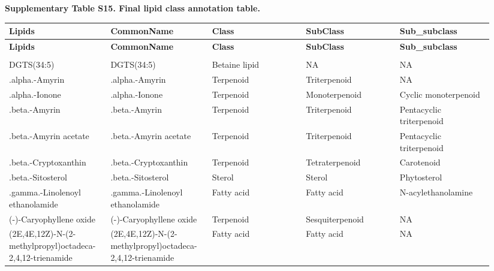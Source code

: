 \clearpage
\begin{landscape}
\begingroup
\scriptsize
\setlength{\LTleft}{0pt}
\setlength{\LTright}{0pt}
\setlength{\tabcolsep}{3pt}
\renewcommand{\arraystretch}{1.08}
\noindent\textbf{Supplementary Table S15. Final lipid class annotation table.}
\par\medskip
\begin{longtable}{>{\raggedright\arraybackslash}p{0.188\linewidth}>{\raggedright\arraybackslash}p{0.188\linewidth}>{\raggedright\arraybackslash}p{0.188\linewidth}>{\raggedright\arraybackslash}p{0.188\linewidth}>{\raggedright\arraybackslash}p{0.188\linewidth}}
\toprule
\textbf{Lipids} & \textbf{CommonName} & \textbf{Class} & \textbf{SubClass} & \textbf{Sub\_subclass} \\
\midrule
\endfirsthead
\toprule
\textbf{Lipids} & \textbf{CommonName} & \textbf{Class} & \textbf{SubClass} & \textbf{Sub\_subclass} \\
\midrule
\endhead
\midrule
\multicolumn{5}{r}{Continued on next page} \\
\endfoot
\bottomrule
\endlastfoot
DGTS(34:5) & DGTS(34:5) & Betaine lipid & NA & NA \\
.alpha.-Amyrin & .alpha.-Amyrin & Terpenoid & Triterpenoid & NA \\
.alpha.-Ionone & .alpha.-Ionone & Terpenoid & Monoterpenoid & Cyclic monoterpenoid \\
.beta.-Amyrin & .beta.-Amyrin & Terpenoid & Triterpenoid & Pentacyclic triterpenoid \\
.beta.-Amyrin acetate & .beta.-Amyrin acetate & Terpenoid & Triterpenoid & Pentacyclic triterpenoid \\
.beta.-Cryptoxanthin & .beta.-Cryptoxanthin & Terpenoid & Tetraterpenoid & Carotenoid \\
.beta.-Sitosterol & .beta.-Sitosterol & Sterol & Sterol & Phytosterol \\
.gamma.-Linolenoyl ethanolamide & .gamma.-Linolenoyl ethanolamide & Fatty acid & Fatty acid & N-acylethanolamine \\
(-)-Caryophyllene oxide & (-)-Caryophyllene oxide & Terpenoid & Sesquiterpenoid & NA \\
(2E,4E,12Z)-N-(2-methylpropyl)octadeca-2,4,12-trienamide & (2E,4E,12Z)-N-(2-methylpropyl)octadeca-2,4,12-trienamide & Fatty acid & Fatty acid & NA \\
\end{longtable}
\endgroup
\end{landscape}
